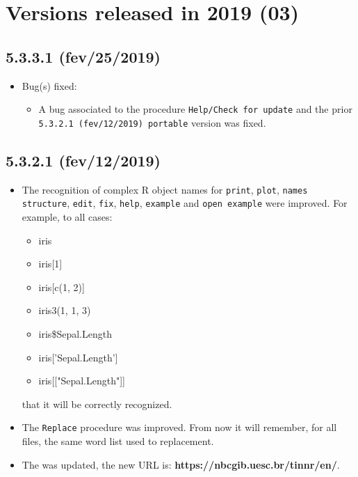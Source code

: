 
\hypertarget{2019}{}
\section{Versions released in 2019 (03)}

\subsection*{5.3.3.1 (fev/25/2019)}
\begin{itemize}
  \item Bug(s) fixed:
    \begin{itemize}
      \item A bug associated to the procedure \texttt{Help/Check for update} and the prior
        \texttt{5.3.2.1 (fev/12/2019) portable} version was fixed.
    \end{itemize}
\end{itemize}

\subsection*{5.3.2.1 (fev/12/2019)}
\begin{itemize}
  \item The recognition of complex R object names for \texttt{print}, \texttt{plot}, \texttt{names}
    \texttt{structure}, \texttt{edit}, \texttt{fix}, \texttt{help}, \texttt{example} and \texttt{open example}
      were improved. For example, to all cases:
    \begin{itemize}
      \item iris
      \item iris[1]
      \item iris[c(1, 2)]
      \item iris3(1, 1, 3)
      \item iris\$Sepal.Length
      \item iris['Sepal.Length']
      \item iris[["Sepal.Length"]]
    \end{itemize}
    that it will be correctly recognized.
  \item The \texttt{Replace} procedure was improved. From now it will remember, for all files, the same
    word list used to replacement.
  \item The  was updated,
    the new URL is: \textbf{https://nbcgib.uesc.br/tinnr/en/}.
\end{itemize}


